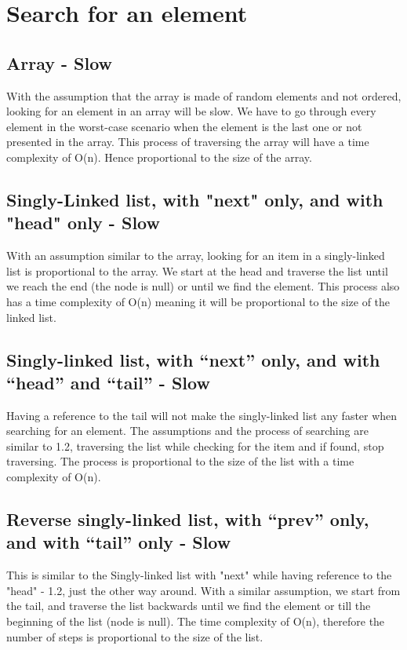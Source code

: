 \documentclass{article}
\begin{document}

\section{Search for an element}
\subsection{Array - Slow}
With the assumption that the array is made of random elements and not ordered, looking for an element in an array will be slow. We have to go through every element in the worst-case scenario when the element is the last one or not presented in the array. This process of traversing the array will have a time complexity of O(n). Hence proportional to the size of the array.

\subsection{Singly-Linked list, with "next" only, and with "head" only - Slow}
With an assumption similar to the array, looking for an item in a singly-linked list is proportional to the array. We start at the head and traverse the list until we reach the end (the node is null) or until we find the element. This process also has a time complexity of O(n) meaning it will be proportional to the size of the linked list.

\subsection{Singly-linked list, with “next” only, and with “head” and “tail” - Slow}
Having a reference to the tail will not make the singly-linked list any faster when searching for an element. The assumptions and the process of searching are similar to 1.2, traversing the list while checking for the item and if found, stop traversing. The process is proportional to the size of the list with a time complexity of O(n).

\subsection{Reverse singly-linked list, with “prev” only, and with “tail” only - Slow}
This is similar to the Singly-linked list with "next" while having reference to the "head" - 1.2, just the other way around. With a similar assumption, we start from the tail, and traverse the list backwards until we find the element or till the beginning of the list (node is null). The time complexity of O(n), therefore the number of steps is proportional to the size of the list.
\end{document}
